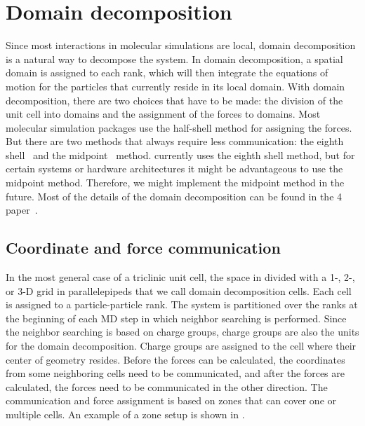 \section{Domain decomposition}
Since most interactions in molecular simulations are local,
domain decomposition is a natural way to decompose the system.
In domain decomposition, a spatial domain is assigned to each rank,
which will then integrate the equations of motion for the particles
that currently reside in its local domain. With domain decomposition,
there are two choices that have to be made: the division of the unit cell
into domains and the assignment of the forces to domains.
Most molecular simulation packages use the half-shell method for assigning
the forces. But there are two methods that always require less communication:
the eighth shell~\cite{Liem1991} and the midpoint~\cite{Shaw2006} method.
{\gromacs} currently uses the eighth shell method, but for certain systems
or hardware architectures it might be advantageous to use the midpoint
method. Therefore, we might implement the midpoint method in the future.
Most of the details of the domain decomposition can be found
in the {\gromacs} 4 paper~\cite{Hess2008b}.

\subsection{Coordinate and force communication}
In the most general case of a triclinic unit cell,
the space in divided with a 1-, 2-, or 3-D grid in parallelepipeds
that we call domain decomposition cells.
Each cell is assigned to a particle-particle rank.
The system is partitioned over the ranks at the beginning
of each MD step in which neighbor searching is performed.
Since the neighbor searching is based on charge groups, charge groups
are also the units for the domain decomposition.
Charge groups are assigned to the cell where their center of geometry resides.
Before the forces can be calculated, the coordinates from some
neighboring cells need to be communicated,
and after the forces are calculated, the forces need to be communicated
in the other direction.
The communication and force assignment is based on zones that 
can cover one or multiple cells.
An example of a zone setup is shown in .

